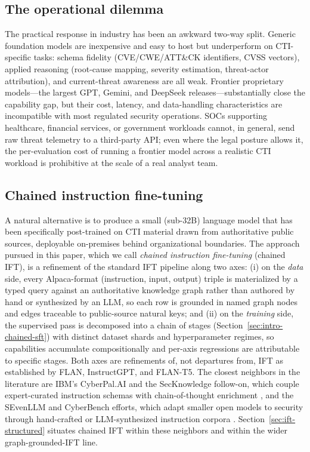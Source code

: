 \documentclass[webpdf,contemporary,large]{oup-authoring-template}
\theoremstyle{thmstyleone}
\theoremstyle{thmstyletwo}
\theoremstyle{thmstylethree}
\begin{document}
\subsection{The operational dilemma}
\label{sec:intro-the-operational-dilemma}
The practical response in industry has been an awkward two-way split. Generic foundation models are inexpensive and easy to host but underperform on CTI-specific tasks: schema fidelity (CVE/CWE/ATT\&CK identifiers, CVSS vectors), applied reasoning (root-cause mapping, severity estimation, threat-actor attribution), and current-threat awareness are all weak. Frontier proprietary models---the largest GPT, Gemini, and DeepSeek releases---substantially close the capability gap, but their cost, latency, and data-handling characteristics are incompatible with most regulated security operations. SOCs supporting healthcare, financial services, or government workloads cannot, in general, send raw threat telemetry to a third-party API; even where the legal posture allows it, the per-evaluation cost of running a frontier model across a realistic CTI workload is prohibitive at the scale of a real analyst team.

\subsection{Chained instruction fine-tuning}
\label{sec:intro-chained-instruction-fine-tuning}
A natural alternative is to produce a small (sub-32B) language model that has been specifically post-trained on CTI material drawn from authoritative public sources, deployable on-premises behind organizational boundaries. The approach pursued in this paper, which we call \textit{chained instruction fine-tuning} (chained IFT), is a refinement of the standard IFT pipeline \cite{wei2022flan,ouyang2022instructgpt,chung2022flant5} along two axes: (i) on the \emph{data} side, every Alpaca-format (instruction, input, output) triple is materialized by a typed query against an authoritative knowledge graph rather than authored by hand or synthesized by an LLM, so each row is grounded in named graph nodes and edges traceable to public-source natural keys; and (ii) on the \emph{training} side, the supervised pass is decomposed into a chain of stages (Section~\ref{sec:intro-chained-sft}) with distinct dataset shards and hyperparameter regimes, so capabilities accumulate compositionally and per-axis regressions are attributable to specific stages. Both axes are refinements of, not departures from, IFT as established by FLAN, InstructGPT, and FLAN-T5. The closest neighbors in the literature are IBM's CyberPal.AI and the SecKnowledge follow-on, which couple expert-curated instruction schemas with chain-of-thought enrichment \cite{levi2024cyberpal,levi2025toward}, and the SEvenLLM and CyberBench efforts, which adapt smaller open models to security through hand-crafted or LLM-synthesized instruction corpora \cite{ji2024sevenllm,liu2024cyberbench}. Section~\ref{sec:ift-structured} situates chained IFT within these neighbors and within the wider graph-grounded-IFT line.
\end{document}
